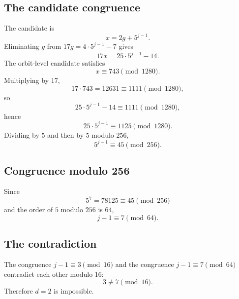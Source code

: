 \subsection{The candidate congruence}

The candidate is
\begin{equation*}
  x=2g+5^{j-1}.
\end{equation*}
Eliminating $g$ from $17g=4\cdot5^{j-1}-7$ gives
\begin{equation*}
  17x=25\cdot5^{j-1}-14.
\end{equation*}
The orbit-level candidate satisfies
\begin{equation*}
  x\equiv743\pmod{1280}.
\end{equation*}
Multiplying by $17$,
\begin{equation*}
  17\cdot743=12631\equiv1111\pmod{1280},
\end{equation*}
so
\begin{equation*}
  25\cdot5^{j-1}-14\equiv1111\pmod{1280},
\end{equation*}
hence
\begin{equation*}
  25\cdot5^{j-1}\equiv1125\pmod{1280}.
\end{equation*}
Dividing by $5$ and then by $5$ modulo $256$,
\begin{equation*}
  5^{j-1}\equiv45\pmod{256}.
\end{equation*}

\subsection{Congruence modulo 256}

Since
\begin{equation*}
  5^7=78125\equiv45\pmod{256}
\end{equation*}
and the order of $5$ modulo $256$ is $64$,
\begin{equation*}
  j-1\equiv7\pmod{64}.
\end{equation*}

\subsection{The contradiction}

The congruence $j-1\equiv3\pmod{16}$ and the congruence
$j-1\equiv7\pmod{64}$ contradict each other modulo $16$:
\begin{equation*}
  3\not\equiv7\pmod{16}.
\end{equation*}
Therefore $d=2$ is impossible.

